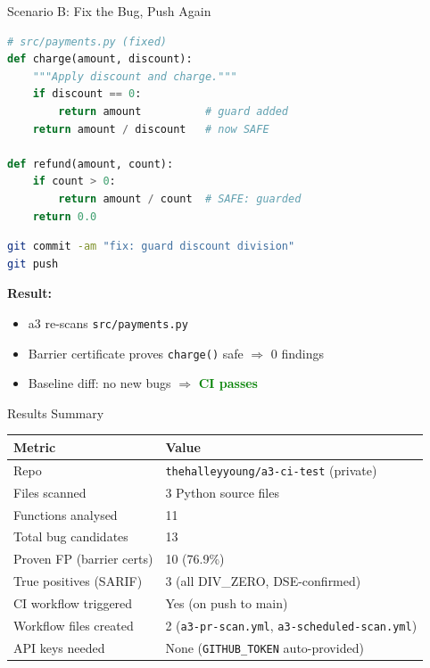 \documentclass[aspectratio=169]{beamer}
\begin{document}
\begin{frame}[fragile]{Scenario B: Fix the Bug, Push Again}
\begin{lstlisting}[language=Python]
# src/payments.py (fixed)
def charge(amount, discount):
    """Apply discount and charge."""
    if discount == 0:
        return amount          # guard added
    return amount / discount   # now SAFE

def refund(amount, count):
    if count > 0:
        return amount / count  # SAFE: guarded
    return 0.0
\end{lstlisting}

\begin{lstlisting}[language=bash]
git commit -am "fix: guard discount division"
git push
\end{lstlisting}

\textbf{Result:}
\begin{itemize}
  \item a3 re-scans \texttt{src/payments.py}
  \item Barrier certificate proves \texttt{charge()} safe $\Rightarrow$ 0 findings
  \item Baseline diff: no new bugs $\Rightarrow$ \textcolor{green}{\textbf{CI passes}}
\end{itemize}
\end{frame}

\begin{frame}{Results Summary}
\begin{table}[h]
\centering
\begin{tabular}{ll}
\toprule
\textbf{Metric} & \textbf{Value} \\
\midrule
Repo & \texttt{thehalleyyoung/a3-ci-test} (private) \\
Files scanned & 3 Python source files \\
Functions analysed & 11 \\
Total bug candidates & 13 \\
Proven FP (barrier certs) & 10 (76.9\%) \\
True positives (SARIF) & 3 (all DIV\_ZERO, DSE-confirmed) \\
CI workflow triggered & Yes (on push to main) \\
Workflow files created & 2 (\texttt{a3-pr-scan.yml}, \texttt{a3-scheduled-scan.yml}) \\
API keys needed & None (\texttt{GITHUB\_TOKEN} auto-provided) \\
\bottomrule
\end{tabular}
\end{table}
\end{frame}
\end{document}
